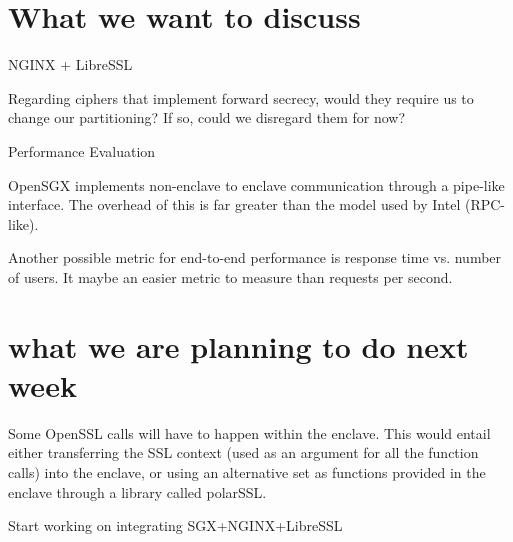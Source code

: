 \documentclass[11pt,agenda]{meetingmins}
\begin{document}
	\section{What we want to discuss}
		\begin{items}
			\item NGINX + LibreSSL
			\begin{items}
				\item Regarding ciphers that implement forward secrecy, would they require us to change our partitioning? If so, could we disregard them for now?
			\end{items}
			\item Performance Evaluation
			\begin{items}
				\item OpenSGX implements non-enclave to enclave communication through a pipe-like interface. The overhead of this is far greater than the model used by Intel (RPC-like). 
				\item Another possible metric for end-to-end performance is response time vs. number of users. It maybe an easier metric to measure than requests per second. 
			\end{items}
		\end{items}
	\section{what we are planning to do next week}
		\begin{items}
			\item 
				Some OpenSSL calls will have to happen within the enclave. This would entail either transferring the SSL context (used as an argument for all the function calls)  into the enclave, or
				using an alternative set as functions provided in the enclave through a library called polarSSL.
			\item 
				Start working on integrating SGX+NGINX+LibreSSL
		\end{items}
\end{document}
